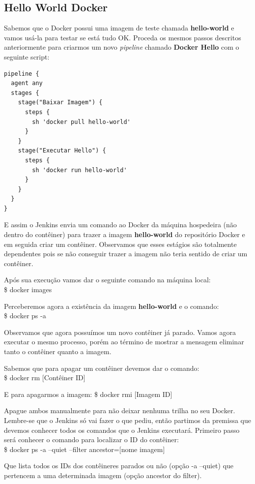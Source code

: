 \documentclass[a4paper,11pt]{article}
\begin{document}
\subsection{Hello World Docker}
Sabemos que o Docker possui uma imagem de teste chamada \textbf{hello-world} e vamos usá-la para testar se está tudo OK. Proceda os mesmos passos descritos anteriormente para criarmos um novo \textit{pipeline} chamado \textbf{Docker Hello} com o seguinte script:
\begin{lstlisting}
pipeline {
  agent any
  stages {
    stage("Baixar Imagem") {
      steps {
        sh 'docker pull hello-world'
      }
    }
    stage("Executar Hello") {
      steps {
        sh 'docker run hello-world'
      }
    }
  }
}
\end{lstlisting}

E assim o Jenkins envia um comando ao Docker da máquina hospedeira (não dentro do contêiner) para trazer a imagem \textbf{hello-world} do repositório Docker e em seguida criar um contêiner. Observamos que esses estágios são totalmente dependentes pois se não conseguir trazer a imagem não teria sentido de criar um contêiner.

Após sua execução vamos dar o seguinte comando na máquina local: \\
{\ttfamily\$ docker images}

Perceberemos agora a existência da imagem \textbf{hello-world} e o comando: \\
{\ttfamily\$ docker ps -a}

Observamos que agora possuímos um novo contêiner já parado. Vamos agora executar o mesmo processo, porém ao término de mostrar a mensagem eliminar tanto o contêiner quanto a imagem. 

Sabemos que para apagar um contêiner devemos dar o comando: \\
{\ttfamily\$ docker rm [Contêiner ID]}

E para apagarmos a imagem:
{\ttfamily\$ docker rmi [Imagem ID]}

Apague ambos manualmente para não deixar nenhuma trilha no seu Docker. Lembre-se que o Jenkins só vai fazer o que pediu, então partimos da premissa que devemos conhecer todos os comandos que o Jenkins executará. Primeiro passo será conhecer o comando para localizar o ID do contêiner: \\
{\ttfamily\$ docker ps -a --quiet --filter ancestor=[nome imagem]}

Que lista todos os IDs dos contêineres parados ou não (opção {\ttfamily -a --quiet}) que pertencem a uma determinada imagem (opção ancestor do filter).
\end{document}

